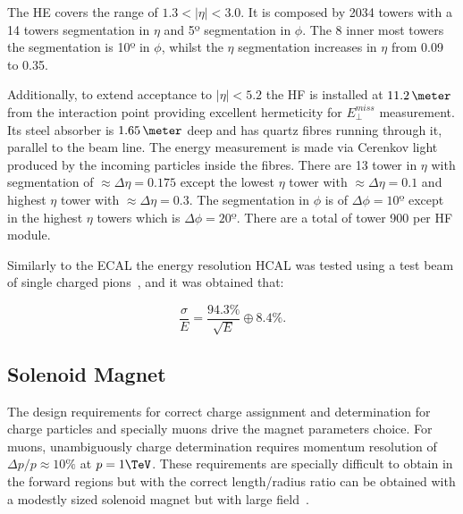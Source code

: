 The \acrfull{HE} covers the range of $1.3<|\eta|<3.0$. It is composed by 2034 towers with a 14 towers segmentation in $\eta$ and 5º segmentation in $\phi$. The 8 inner most towers the segmentation is 10º in $\phi$, whilst the $\eta$ segmentation increases in $\eta$ from 0.09 to 0.35.

Additionally, to extend acceptance to $|\eta|<5.2$ the \gls{HF} is installed at $11.2\,\meter$ from the interaction point providing excellent hermeticity for $E_{\perp}^{miss}$ measurement. Its steel absorber is $1.65\,\meter$ deep and has quartz fibres running through it, parallel to the beam line. The energy measurement is made via Cerenkov light produced by the incoming particles inside the fibres. There are 13 tower in $\eta$ with segmentation of $\approx \Delta\eta=0.175$ except the lowest $\eta$ tower with $\approx \Delta\eta=0.1$ and highest $\eta$ tower with $\approx \Delta\eta=0.3$. The segmentation in $\phi$ is of $\Delta\phi=10º$ except in the highest $\eta$ towers which is $\Delta\phi=20º$. There are a total of tower 900 per \gls{HF} module. 

Similarly to the \gls{ECAL} the energy resolution \gls{HCAL} was tested using a test beam of single charged pions~\cite{ARTICLE:CMSECALTestBeam}, and it was obtained that:

\begin{equation}
\frac{\sigma}{E} = \frac{94.3\%}{\sqrt{E}} \oplus 8.4\%.
\end{equation}

\subsection{Solenoid Magnet}
\label{SUBSECTION:ExperimentalApparatus_CMS_Magnet}


The design requirements for correct charge assignment and \pt determination for charge particles and specially muons drive the magnet parameters choice. For muons, unambiguously charge determination requires momentum resolution of $\Delta p/p \approx 10\%$ at $p = 1 \TeV$. These requirements are specially difficult to obtain in the forward regions but with the correct length/radius ratio can be obtained with a modestly sized solenoid magnet but with large field~\cite{CMSTDR:CMSPhysicsVol1,CMSTDR:CMSMagnet}.

